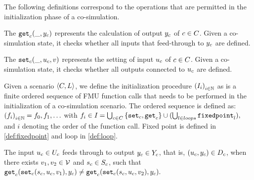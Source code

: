 The following definitions correspond to the operations that are permitted in the initialization phase of a co-simulation.
\begin{definition}\label{def:getout}
The $\mathtt{get}_{c}(\_, y_{c})$ represents the calculation of output $y_{c}$ of $c \in C$. Given a co-simulation state, it checks whether all inputs that feed-through to $y_{c}$ are defined.
\end{definition}

\begin{definition}\label{def:setin}
The $\mathtt{set}_{c}(\_, u_{c}, v)$ represents the setting of input $u_{c}$  of $c \in C$. Given a co-simulation state, it checks whether all outputs connected to $u_{c}$ are defined.
\end{definition}

\begin{definition}[Initialization]\label{def:initialization}
  Given a scenario $ \left\langle C, L \right\rangle $, we define the initialization procedure $ \left( I_i \right)_{i \in \mathbb{N}}$ as is a finite ordered sequence of FMU function calls that needs to be performed in the initialization of a co-simulation scenario. The ordered sequence is defined as: $ \left( f_i \right)_{i \in \mathbb{N}} = f_0, f_1, \ldots$ with
  $f_i \in I_{} = \bigcup_{c \in C}  \left\{ \mathtt{set}_{c},\mathtt{get}_{c} \right\} \cup (\bigcup_{l \in loops} \mathtt{fixedpoint}_{l}),$
  and $i$ denoting the order of the function call.
  Fixed point is defined in \cref{def:fixedpoint} and loop in \cref{def:loop}.
\end{definition}

\begin{definition}\label{def:feedthrough}
  The input $u_{c} \in U_{c}$ feeds through to output $y_{c} \in Y_{c}$, that is, $(u_{c},y_{c}) \in D_{c}$, when there exists $v_1, v_2 \in \mathcal{V}$ and $s_{c} \in S_{c}$, such that
  $
  \mathtt{get}_{c} (\mathtt{set}_{c}(s_{c}, u_{c}, v_1), y_{c}) \neq \mathtt{get}_{c} (\mathtt{set}_{c}(s_{c}, u_{c}, v_2), y_{c}).
  $
\end{definition}


